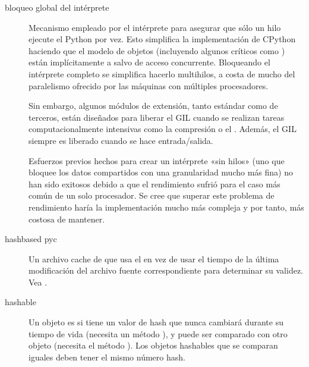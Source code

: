 \documentclass[a4,10pt,spanish]{sphinxmanual}
\begin{document}
\begin{description}
\item[{bloqueo global del intérprete\label{\detokenize{glossary:term-global-interpreter-lock}}}] \leavevmode
\sphinxAtStartPar
Mecanismo empleado por el intérprete {\hyperref[\detokenize{glossary:term-CPython}]{}} para asegurar que sólo un hilo ejecute el  {\hyperref[\detokenize{glossary:term-bytecode}]{}} Python por vez. Esto simplifica la implementación de CPython haciendo que el modelo de objetos (incluyendo algunos críticos como ) están implícitamente a salvo de acceso concurrente.  Bloqueando el intérprete completo se simplifica hacerlo multi\sphinxhyphen{}hilos, a costa de mucho del paralelismo ofrecido por las máquinas con múltiples procesadores.

\sphinxAtStartPar
Sin embargo, algunos módulos de extensión, tanto estándar como de terceros, están diseñados para liberar el GIL cuando se realizan tareas computacionalmente intensivas como la compresión o el .  Además, el GIL siempre es liberado cuando se hace entrada/salida.

\sphinxAtStartPar
Esfuerzos previos hechos para crear un intérprete «sin hilos» (uno que bloquee los datos compartidos con una granularidad mucho más fina) no han sido exitosos debido a que el rendimiento sufrió para el caso más común de un solo procesador. Se cree que superar este problema de rendimiento haría la implementación mucho más compleja y por tanto, más costosa de mantener.

\item[{hash\sphinxhyphen{}based pyc\label{\detokenize{glossary:term-hash-based-pyc}}}] \leavevmode
\sphinxAtStartPar
Un archivo cache de  que usa el  en vez de usar el tiempo de la última modificación del archivo fuente correspondiente para determinar su validez. Vea .

\item[{hashable\label{\detokenize{glossary:term-hashable}}}] \leavevmode
\sphinxAtStartPar
Un objeto es  si tiene un valor de hash que nunca cambiará durante su tiempo de vida (necesita un método  ), y puede ser comparado con otro objeto (necesita el método  ).  Los objetos hashables que se comparan iguales deben tener el mismo número hash.


\end{description}
\end{document}
